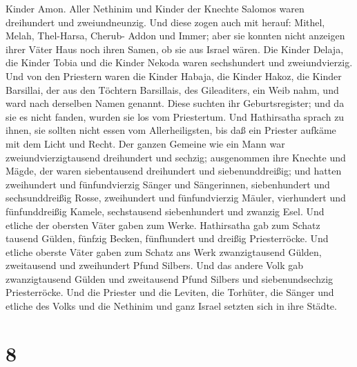 Kinder Amon.  Aller Nethinim und Kinder der Knechte Salomos
waren dreihundert und zweiundneunzig.  Und diese zogen auch
mit herauf: Mithel, Melah, Thel-Harsa, Cherub- Addon und Immer; aber sie
konnten nicht anzeigen ihrer Väter Haus noch ihren Samen, ob sie aus
Israel wären.  Die Kinder Delaja, die Kinder Tobia und die
Kinder Nekoda waren sechshundert und zweiundvierzig.  Und
von den Priestern waren die Kinder Habaja, die Kinder Hakoz, die Kinder
Barsillai, der aus den Töchtern Barsillais, des Gileaditers, ein Weib
nahm, und ward nach derselben Namen genannt.  Diese suchten
ihr Geburtsregister; und da sie es nicht fanden, wurden sie los vom
Priestertum.  Und Hathirsatha sprach zu ihnen, sie sollten
nicht essen vom Allerheiligsten, bis daß ein Priester aufkäme mit dem
Licht und Recht.  Der ganzen Gemeine wie ein Mann war
zweiundvierzigtausend dreihundert und sechzig;  ausgenommen
ihre Knechte und Mägde, der waren siebentausend dreihundert und
siebenunddreißig; und hatten zweihundert und fünfundvierzig Sänger und
Sängerinnen,  siebenhundert und sechsunddreißig Rosse,
zweihundert und fünfundvierzig Mäuler,  vierhundert und
fünfunddreißig Kamele, sechstausend siebenhundert und zwanzig Esel.
 Und etliche der obersten Väter gaben zum Werke.
Hathirsatha gab zum Schatz tausend Gülden, fünfzig Becken, fünfhundert
und dreißig Priesterröcke.  Und etliche oberste Väter gaben
zum Schatz ans Werk zwanzigtausend Gülden, zweitausend und zweihundert
Pfund Silbers.  Und das andere Volk gab zwanzigtausend
Gülden und zweitausend Pfund Silbers und siebenundsechzig Priesterröcke.
 Und die Priester und die Leviten, die Torhüter, die Sänger
und etliche des Volks und die Nethinim und ganz Israel setzten sich in
ihre Städte.

\hypertarget{section-7}{%
\section{8}\label{section-7}}


